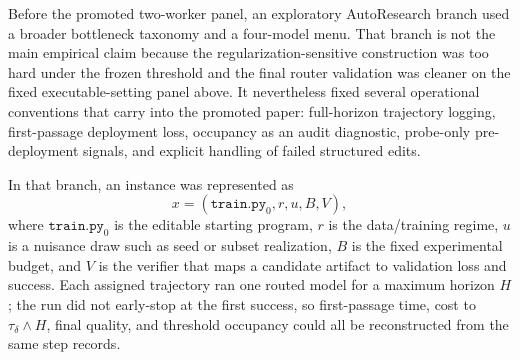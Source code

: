 \documentclass{article}
\begin{document}
Before the promoted two-worker panel, an exploratory AutoResearch branch used a broader bottleneck taxonomy and a four-model menu.
That branch is not the main empirical claim because the regularization-sensitive construction was too hard under the frozen threshold and the final router validation was cleaner on the fixed executable-setting panel above.
It nevertheless fixed several operational conventions that carry into the promoted paper: full-horizon trajectory logging, first-passage deployment loss, occupancy as an audit diagnostic, probe-only pre-deployment signals, and explicit handling of failed structured edits.

In that branch, an instance was represented as
\[
  x=(\texttt{train.py}_0,r,u,B,V),
\]
where \(\texttt{train.py}_0\) is the editable starting program, \(r\) is the data/training regime, \(u\) is a nuisance draw such as seed or subset realization, \(B\) is the fixed experimental budget, and \(V\) is the verifier that maps a candidate artifact to validation loss and success.
Each assigned trajectory ran one routed model for a maximum horizon \(H\); the run did not early-stop at the first success, so first-passage time, cost to \(\tau_\delta\wedge H\), final quality, and threshold occupancy could all be reconstructed from the same step records.
\end{document}
